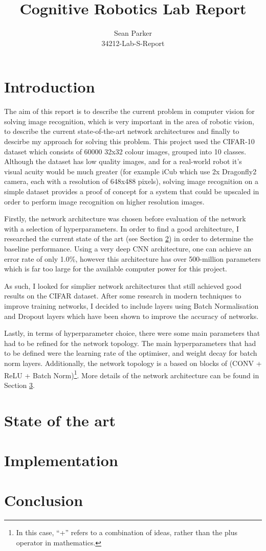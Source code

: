 \documentclass[12pt]{article}
\title{Cognitive Robotics Lab Report}
\author{Sean Parker\\
34212-Lab-S-Report}
\begin{document}
\maketitle

\section{Introduction}
The aim of this report is to describe the current problem in computer vision for solving image recognition, which is very important in the area of robotic vision, to describe the current state-of-the-art network architectures and finally to descirbe my approach for solving this problem. This project used the CIFAR-10 dataset which consists of 60000 32x32 colour images, grouped into 10 classes. Although the dataset has low quality images, and for a real-world robot it's visual acuity would be much greater (for example iCub which use 2x Dragonfly2 camera, each with a resolution of 648x488 pixels), solving image recognition on a simple dataset provides a proof of concept for a system that could be upscaled in order to perform image recognition on higher resolution images.

Firstly, the network architecture was chosen before evaluation of the network with a selection of hyperparameters. In order to find a good architecture, I researched the current state of the art (see Section \ref{sec:soa}) in order to determine the baseline performance. Using a very deep CNN architecture, one can achieve an error rate of only 1.0\%\cite{huang2018gpipe}, however this architecture has over 500-million parameters which is far too large for the available computer power for this project.

As such, I looked for simplier network architectures that still achieved good results on the CIFAR dataset. After some research in modern techniques to improve training networks, I decided to include layers using Batch Normalisation and Dropout layers which have been shown to improve the accuracy of networks\cite{dropout, batch-norm}.

Lastly, in terms of hyperparameter choice, there were some main parameters that had to be refined for the network topology. The main hyperparameters that had to be defined were the learning rate of the optimiser, and weight decay for batch norm layers. Additionally, the network topology is a based on blocks of (CONV + ReLU + Batch Norm)\footnote{In this case, ``+'' refers to a combination of ideas, rather than the plus operator in mathematics.}. More details of the network architecture can be found in Section \ref{sec:imple}.

\section{State of the art}
\label{sec:soa}


\section{Implementation}
\label{sec:imple}

\section{Conclusion}



\end{document}
